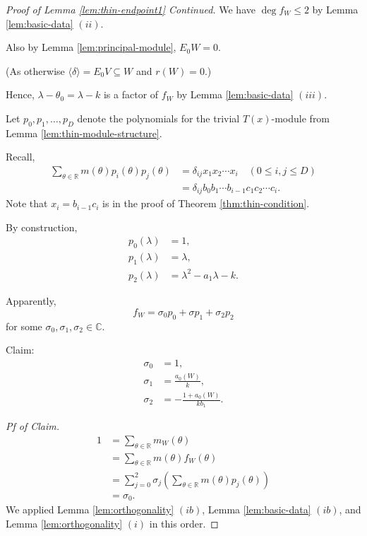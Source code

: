\documentclass[
]{book}
\theoremstyle{definition}
\theoremstyle{definition}
\theoremstyle{definition}
\theoremstyle{definition}
\theoremstyle{remark}
\begin{document}
\begin{proof}[Proof of Lemma \ref{lem:thin-endpoint1} Continued]
\leavevmode

We have \(\deg f_W\leq 2\) by Lemma \ref{lem:basic-data} \((ii)\).

Also by Lemma \ref{lem:principal-module}, \(E_0W = 0\).

(As otherwise \(\langle \delta \rangle = E_0V \subseteq W\) and \(r(W) = 0\).)

Hence, \(\lambda - \theta_0 = \lambda - k\) is a factor of \(f_W\) by Lemma \ref{lem:basic-data} \((iii)\).

Let \(p_0, p_1, \ldots, p_D\) denote the polynomials for the trivial \(T(x)\)-module from Lemma \ref{lem:thin-module-structure}.

Recall,
\begin{align}
\sum_{\theta\in \mathbb{R}}m(\theta)p_i(\theta)p_j(\theta) & = \delta_{ij}x_1x_2\cdots x_i \quad (0\leq i,j\leq D)\\
& = \delta_{ij}b_0b_1\cdots b_{i-1}c_1c_2\cdots c_i.
\end{align}
Note that \(x_i = b_{i-1}c_i\) is in the proof of Theorem \ref{thm:thin-condition}.

By construction,
\begin{align}
p_0(\lambda) & = 1,\\
p_1(\lambda) & = \lambda,\\
p_2(\lambda) & = \lambda^2 - a_1\lambda - k.
\end{align}

Apparently,
\[f_W = \sigma_0 p_0 + \sigma p_1 + \sigma_2 p_2\]
for some \(\sigma_0, \sigma_1, \sigma_2\in \mathbb{C}\).

Claim:
\begin{align}
\sigma_0 & = 1,\\
\sigma_1 & = \frac{a_0(W)}{k},\\
\sigma_2 & = -\frac{1+a_0(W)}{kb_1}.
\end{align}

\emph{Pf of Claim.}
\begin{align}
1 & = \sum_{\theta\in \mathbb{R}}m_W(\theta)\\
& = \sum_{\theta\in \mathbb{R}}m(\theta)f_W(\theta)\\
& = \sum_{j=0}^2 \sigma_j\left(\sum_{\theta\in \mathbb{R}}m(\theta)p_j(\theta)\right)\\
& = \sigma_0.
\end{align}
We applied Lemma \ref{lem:orthogonality} \((ib)\), Lemma \ref{lem:basic-data} \((ib)\), and Lemma \ref{lem:orthogonality} \((i)\) in this order.


\end{proof}
\end{document}
